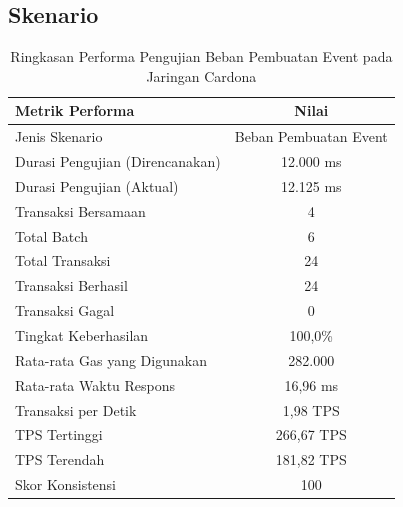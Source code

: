 \subsection{Skenario}
\begin{table}[h!]
  \centering
  \begin{tabular}{|l|c|}
    \hline
    \textbf{Metrik Performa}        & \textbf{Nilai}        \\
    \hline
    Jenis Skenario                  & Beban Pembuatan Event \\
    \hline
    Durasi Pengujian (Direncanakan) & 12.000 ms             \\
    \hline
    Durasi Pengujian (Aktual)       & 12.125 ms             \\
    \hline
    Transaksi Bersamaan             & 4                     \\
    \hline
    Total Batch                     & 6                     \\
    \hline
    Total Transaksi                 & 24                    \\
    \hline
    Transaksi Berhasil              & 24                    \\
    \hline
    Transaksi Gagal                 & 0                     \\
    \hline
    Tingkat Keberhasilan            & 100,0\%               \\
    \hline
    Rata-rata Gas yang Digunakan    & 282.000               \\
    \hline
    Rata-rata Waktu Respons         & 16,96 ms              \\
    \hline
    Transaksi per Detik             & 1,98 TPS              \\
    \hline
    TPS Tertinggi                   & 266,67 TPS            \\
    \hline
    TPS Terendah                    & 181,82 TPS            \\
    \hline
    Skor Konsistensi                & 100                   \\
    \hline
  \end{tabular}
  \caption{Ringkasan Performa Pengujian Beban Pembuatan Event pada Jaringan Cardona}
  \label{tab:event_creation_summary}
\end{table}
